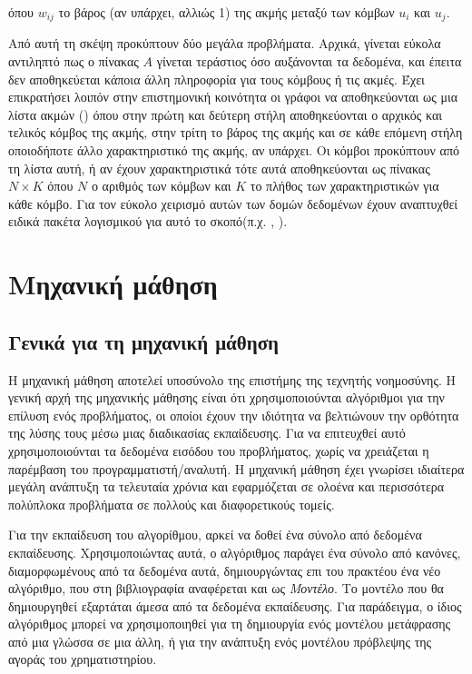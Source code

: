 όπου \(w_{ij}\) το βάρος (αν υπάρχει, αλλιώς 1) της ακμής μεταξύ των κόμβων \(u_i\) και
\(u_j\). 

Από αυτή τη σκέψη προκύπτουν δύο μεγάλα προβλήματα. Αρχικά, γίνεται εύκολα αντιληπτό πως ο
πίνακας \(A\) γίνεται τεράστιος όσο αυξάνονται τα δεδομένα, και έπειτα δεν αποθηκεύεται
κάποια άλλη πληροφορία για τους κόμβους ή τις ακμές. Έχει επικρατήσει λοιπόν στην
επιστημονική κοινότητα οι γράφοι να αποθηκεύονται ως μια λίστα ακμών () όπου
στην πρώτη και δεύτερη στήλη αποθηκεύονται ο αρχικός και τελικός κόμβος της ακμής, στην
τρίτη το βάρος της ακμής και σε κάθε επόμενη στήλη οποιοδήποτε άλλο χαρακτηριστικό της
ακμής, αν υπάρχει. Οι κόμβοι προκύπτουν από τη λίστα αυτή, ή
αν έχουν χαρακτηριστικά τότε αυτά αποθηκεύονται ως πίνακας \(N \times K\) όπου \(N\) ο
αριθμός των κόμβων και \(K\) το πλήθος των χαρακτηριστικών για κάθε κόμβο. Για τον εύκολο
χειρισμό αυτών των δομών δεδομένων έχουν αναπτυχθεί ειδικά πακέτα λογισμικού για αυτό το σκοπό(π.χ. 
\cite{StellarGraph}, \cite{Networkx}).

\section{Μηχανική μάθηση}

\subsection{Γενικά για τη μηχανική μάθηση}

Η μηχανική μάθηση αποτελεί υποσύνολο της επιστήμης της τεχνητής νοημοσύνης. Η γενική
αρχή της μηχανικής μάθησης είναι ότι χρησιμοποιούνται αλγόριθμοι για την επίλυση ενός 
προβλήματος, οι οποίοι έχουν την ιδιότητα να βελτιώνουν την ορθότητα της λύσης τους
μέσω μιας διαδικασίας εκπαίδευσης\cite{DataMining}. Για να επιτευχθεί αυτό χρησιμοποιούνται
τα δεδομένα εισόδου του προβλήματος, χωρίς να χρειάζεται η παρέμβαση του προγραμματιστή/αναλυτή.
Η μηχανική μάθηση έχει γνωρίσει  ιδιαίτερα μεγάλη ανάπτυξη τα τελευταία χρόνια και εφαρμόζεται σε
ολοένα και περισσότερα πολύπλοκα προβλήματα σε πολλούς και διαφορετικούς τομείς.

Για την εκπαίδευση του αλγορίθμου, αρκεί να δοθεί ένα σύνολο από δεδομένα εκπαίδευσης.
Χρησιμοποιώντας αυτά, ο αλγόριθμος παράγει ένα σύνολο από κανόνες, διαμορφωμένους από τα
δεδομένα αυτά, δημιουργώντας επι του πρακτέου ένα νέο αλγόριθμο, που στη βιβλιογραφία 
αναφέρεται και ως \emph{Μοντέλο}. Το μοντέλο που θα δημιουργηθεί εξαρτάται άμεσα από τα
δεδομένα εκπαίδευσης. Για παράδειγμα, ο ίδιος αλγόριθμος μπορεί να χρησιμοποιηθεί για
τη δημιουργία ενός μοντέλου μετάφρασης από μια γλώσσα σε μια άλλη, ή για την ανάπτυξη
ενός μοντέλου πρόβλεψης της αγοράς του χρηματιστηρίου.

